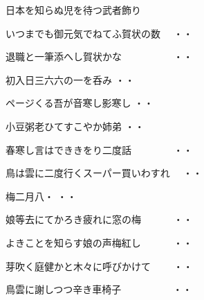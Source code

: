\begin{shiika}日本を知らぬ児を待つ武者飾り　　　
\begin{shiika}いつまでも御元気でねてふ賀状の数　
\hfill{・・}\end{shiika}

\begin{shiika}退職と一筆添へし賀状かな　　　　　
\hfill{・・}\end{shiika}

\begin{shiika}初入日三六六の一を呑み
\hfill{・・}\end{shiika}

\begin{shiika}ページくる吾が音寒し影寒し
\hfill{・・}\end{shiika}

\begin{shiika}小豆粥老ひてすこやか姉弟
\hfill{・・}\end{shiika}

\begin{shiika}春寒し言はでききをり二度話　　　　
\hfill{・・}\end{shiika}

\begin{shiika}鳥は雲に二度行くスーパー買いわすれ　
\hfill{・・}\end{shiika}

\begin{shiika}梅二月八・
\hfill{・・}\end{shiika}

\begin{shiika}娘等去にてかろき疲れに窓の梅　　　
\hfill{・・}\end{shiika}

\begin{shiika}よきことを知らす娘の声梅紅し　　　
\hfill{・・}\end{shiika}

\begin{shiika}芽吹く庭健かと木々に呼びかけて　　
\hfill{・・}\end{shiika}

\begin{shiika}鳥雲に謝しつつ辛き車椅子　　　　　
\hfill{・・}\end{shiika}


\end{shiika}
